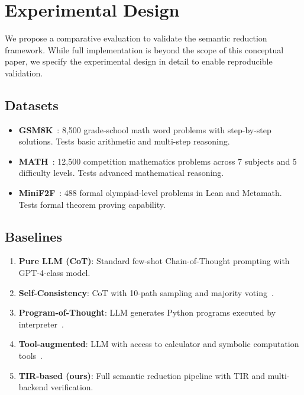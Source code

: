 \documentclass[11pt,a4paper]{article}
\begin{document}
\section{Experimental Design}
\label{sec:experiments}

We propose a comparative evaluation to validate the semantic reduction framework. While full implementation is beyond the scope of this conceptual paper, we specify the experimental design in detail to enable reproducible validation.

\subsection{Datasets}

\begin{itemize}[leftmargin=*]
    \item \textbf{GSM8K}~\cite{cobbe2021gsm8k}: 8,500 grade-school math word problems with step-by-step solutions. Tests basic arithmetic and multi-step reasoning.
    \item \textbf{MATH}~\cite{hendrycks2021math}: 12,500 competition mathematics problems across 7 subjects and 5 difficulty levels. Tests advanced mathematical reasoning.
    \item \textbf{MiniF2F}~\cite{zheng2022minif2f}: 488 formal olympiad-level problems in Lean and Metamath. Tests formal theorem proving capability.
\end{itemize}

\subsection{Baselines}

\begin{enumerate}[leftmargin=*]
    \item \textbf{Pure LLM (CoT)}: Standard few-shot Chain-of-Thought prompting with GPT-4-class model.
    \item \textbf{Self-Consistency}: CoT with 10-path sampling and majority voting~\cite{wang2022self}.
    \item \textbf{Program-of-Thought}: LLM generates Python programs executed by interpreter~\cite{chen2022program}.
    \item \textbf{Tool-augmented}: LLM with access to calculator and symbolic computation tools~\cite{schick2023toolformer}.
    \item \textbf{TIR-based (ours)}: Full semantic reduction pipeline with TIR and multi-backend verification.
\end{enumerate}
\end{document}
